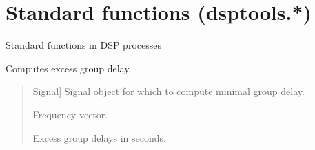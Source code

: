 \documentclass[letterpaper,10pt,english]{sphinxmanual}
\begin{document}
\sphinxstepscope


\section{Standard functions (dsptools.*)}
\label{\detokenize{modules/dsptools.standard_functions:module-dsptools.standard_functions}}\label{\detokenize{modules/dsptools.standard_functions:standard-functions-dsptools}}\label{\detokenize{modules/dsptools.standard_functions::doc}}
\sphinxAtStartPar
Standard functions in DSP processes

\begin{fulllineitems}
\label{\detokenize{modules/dsptools.standard_functions:dsptools.standard_functions.excess_group_delay}}
\pysigstartsignatures
{}
\pysigstopsignatures
\sphinxAtStartPar
Computes excess group delay.
\begin{quote}\begin{description}
\begin{description}
\sphinxlineitem{\sphinxstylestrong{signal}}{[}Signal{]}
\sphinxAtStartPar
Signal object for which to compute minimal group delay.

\end{description}

\begin{description}
\sphinxlineitem{\sphinxstylestrong{f}}{[}\sphinxtitleref{np.ndarray}{]}
\sphinxAtStartPar
Frequency vector.

\sphinxlineitem{\sphinxstylestrong{ex\_gd}}{[}\sphinxtitleref{np.ndarray}{]}
\sphinxAtStartPar
Excess group delays in seconds.

\end{description}

\end{description}\end{quote}

\end{fulllineitems}
\end{document}
